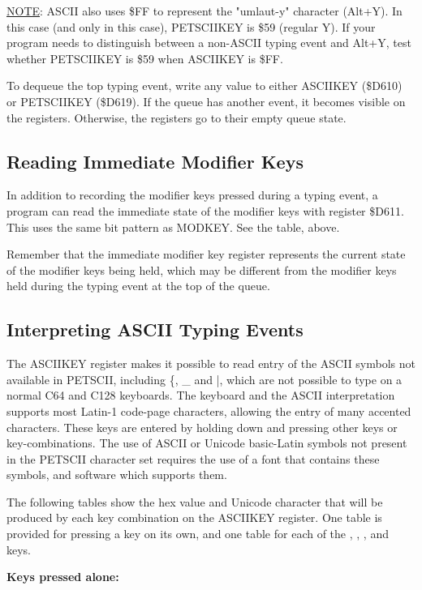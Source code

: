 \underline{NOTE}: ASCII also uses \$FF to represent the "umlaut-y" character
(Alt+Y). In this case (and only in this case), PETSCIIKEY is \$59 (regular Y).
If your program needs to distinguish between a non-ASCII typing event and
Alt+Y, test whether PETSCIIKEY is \$59 when ASCIIKEY is \$FF.

To dequeue the top typing event, write any value to either ASCIIKEY (\$D610)
or PETSCIIKEY (\$D619). If the queue has another event, it becomes visible on
the registers. Otherwise, the registers go to their empty queue state.

\subsection{Reading Immediate Modifier Keys}

In addition to recording the modifier keys pressed during a typing event, a
program can read the immediate state of the modifier keys with register
\$D611. This uses the same bit pattern as MODKEY. See the table, above.

Remember that the immediate modifier key register represents the current state
of the modifier keys being held, which may be different from the modifier keys
held during the typing event at the top of the queue.

\subsection{Interpreting ASCII Typing Events}

The ASCIIKEY register makes it possible to read entry of the ASCII symbols not
available in PETSCII, including \{, \_ and |, which are not possible to type
on a normal C64 and C128 keyboards. The keyboard and the ASCII interpretation
supports most Latin-1 code-page characters, allowing the entry of many
accented characters. These keys are entered by holding down \megasymbolkey and
pressing other keys or key-combinations. The use of ASCII or Unicode
basic-Latin symbols not present in the PETSCII character set requires the use
of a font that contains these symbols, and software which supports them.

The following tables show the hex value and Unicode character that will be
produced by each key combination on the ASCIIKEY register. One table is
provided for pressing a key on its own, and one table for each of the
, , \megasymbolkey, and 
keys.

\begin{minipage}{\textwidth}
\bf{Keys pressed alone:}

\end{minipage}

